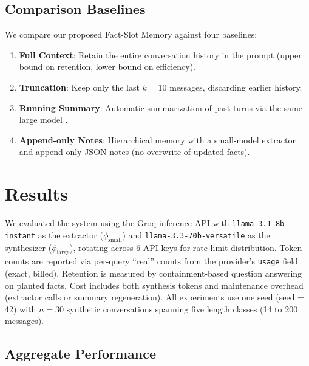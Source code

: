 \documentclass[conference]{IEEEtran}
\begin{document}
\subsection{Comparison Baselines}
\label{sec:baselines}

We compare our proposed Fact-Slot Memory against four baselines:
\begin{enumerate}
    \item \textbf{Full Context}: Retain the entire conversation history in the prompt (upper bound on retention, lower bound on efficiency).
    \item \textbf{Truncation}: Keep only the last $k = 10$ messages, discarding earlier history.
    \item \textbf{Running Summary}: Automatic summarization of past turns via the same large model \cite{sung2024wmt}.
    \item \textbf{Append-only Notes}: Hierarchical memory with a small-model extractor and append-only JSON notes (no overwrite of updated facts).
\end{enumerate}

\section{Results}
\label{sec:results}

We evaluated the system using the Groq inference API with \texttt{llama-3.1-8b-instant} as the extractor ($\phi_{\text{small}}$) and \texttt{llama-3.3-70b-versatile} as the synthesizer ($\phi_{\text{large}}$), rotating across 6 API keys for rate-limit distribution. Token counts are reported via per-query ``real'' counts from the provider's \texttt{usage} field (exact, billed). Retention is measured by containment-based question answering on planted facts. Cost includes both synthesis tokens and maintenance overhead (extractor calls or summary regeneration). All experiments use one seed (seed = 42) with $n=30$ synthetic conversations spanning five length classes (14 to 200 messages).

\subsection{Aggregate Performance}
\end{document}
